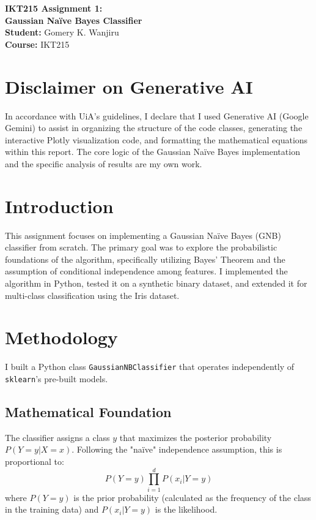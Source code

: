 \documentclass[11pt]{article}
\begin{document}
\begin{titlepage}
    \centering
    \vspace*{2cm}
    \Huge\textbf{IKT215 Assignment 1: \\ Gaussian Naïve Bayes Classifier} \\
    \vspace{1.5cm}
    \Large \textbf{Student:} Gomery K. Wanjiru\\
    \Large \textbf{Course:} IKT215 \\
    \vfill
    \section*{Disclaimer on Generative AI}
    In accordance with UiA's guidelines, I declare that I used Generative AI (Google Gemini) to assist in organizing the structure of the code classes, generating the interactive Plotly visualization code, and formatting the mathematical equations within this report. The core logic of the Gaussian Naïve Bayes implementation and the specific analysis of results are my own work.
\end{titlepage}

\newpage
\section{Introduction}
This assignment focuses on implementing a Gaussian Naïve Bayes (GNB) classifier from scratch. The primary goal was to explore the probabilistic foundations of the algorithm, specifically utilizing Bayes' Theorem and the assumption of conditional independence among features. I implemented the algorithm in Python, tested it on a synthetic binary dataset, and extended it for multi-class classification using the Iris dataset.

\section{Methodology}
I built a Python class \texttt{GaussianNBClassifier} that operates independently of \texttt{sklearn}'s pre-built models. 

\subsection{Mathematical Foundation}
The classifier assigns a class $y$ that maximizes the posterior probability $P(Y=y|X=x)$. Following the "naïve" independence assumption, this is proportional to:
\begin{equation}
P(Y=y) \prod_{i=1}^{d} P(x_i|Y=y)
\end{equation}
where $P(Y=y)$ is the prior probability (calculated as the frequency of the class in the training data) and $P(x_i|Y=y)$ is the likelihood.
\end{document}
